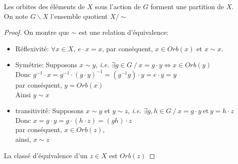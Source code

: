 \documentclass[../main.tex]{subfile}
\begin{document}
\begin{corrol}
	Les orbites des éléments de $X$ sous l'action de $G$ forment une partition de $X$.\\
	On note $G \backslash X$ %
	l'ensemble quotient $X / \sim$
\end{corrol}

\begin{proof}
	On montre que $\sim$ est une relation d'équivalence:\\
\begin{itemize}	
	\item Réflexivité: $\forall x \in X, \ e \cdot x = x$, par conséquent, $x \in Orb(x)$ et $x \sim x$.
	\item Symétrie: Supposons $x \sim y$, \textit{i.e.} $\exists g \in G \ / \ x = g \cdot y \Leftrightarrow x \in Orb(y)$\\
	Donc $g^{-1} \cdot x = g^{-1} \cdot (g \cdot y)^{-1} = (g^{-1}g) \cdot y = e \cdot y = y$\\
	par conséquent, $y = Orb(x)$\\
	Ainsi $y \sim x$
	\item transitivité: Supposons $x \sim y$ et $y \sim z$, \textit{i.e.} $\exists g, h \in G \ / \ x = g \cdot y \ \text{et} \ y = h \cdot z$\\
	Donc $x = g \cdot y = g \cdot (h \cdot z) = (gh) \cdot z$\\
	par conséquent, $x \in Orb(z)$,\\
	ainsi, $x \sim z$
\end{itemize}
	La classé d'équivalence d'un $z \in X$ est $Orb(z)$
\end{proof}
\end{document}
